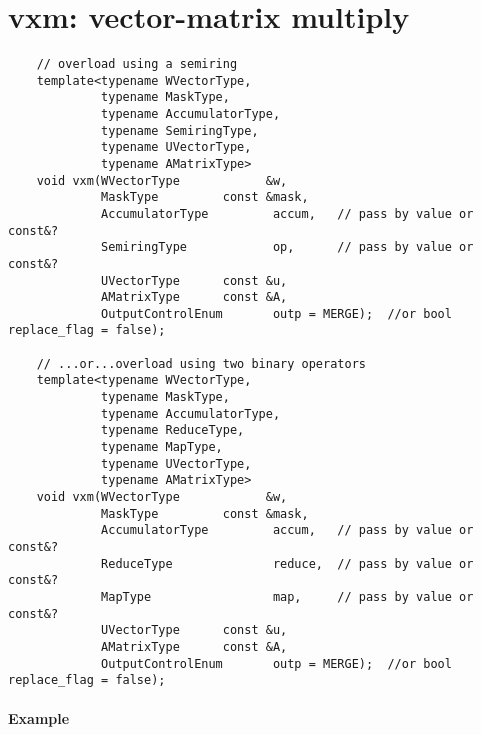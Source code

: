 \begin{verbatim}

\end{verbatim}

\section{{\sf vxm}: vector-matrix multiply}

\paragraph{\syntax}

\begin{verbatim}
    // overload using a semiring
    template<typename WVectorType,
             typename MaskType,
             typename AccumulatorType,
             typename SemiringType,
             typename UVectorType,
             typename AMatrixType>
    void vxm(WVectorType            &w,
             MaskType         const &mask,
             AccumulatorType         accum,   // pass by value or const&?
             SemiringType            op,      // pass by value or const&?
             UVectorType      const &u,
             AMatrixType      const &A,
             OutputControlEnum       outp = MERGE);  //or bool replace_flag = false);

    // ...or...overload using two binary operators
    template<typename WVectorType,
             typename MaskType,
             typename AccumulatorType,
             typename ReduceType,
             typename MapType,
             typename UVectorType,
             typename AMatrixType>
    void vxm(WVectorType            &w,
             MaskType         const &mask,
             AccumulatorType         accum,   // pass by value or const&?
             ReduceType              reduce,  // pass by value or const&?
             MapType                 map,     // pass by value or const&?
             UVectorType      const &u,
             AMatrixType      const &A,
             OutputControlEnum       outp = MERGE);  //or bool replace_flag = false);
\end{verbatim}


\paragraph{Example}

\begin{verbatim}

\end{verbatim}


